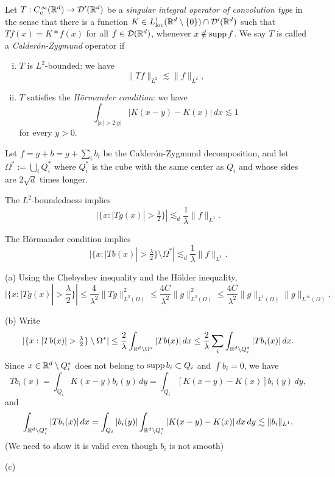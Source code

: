 \documentclass{../../large}
\begin{document}
\begin{prb}
Let $T:C_c^\infty(\mathbb{R}^d)\to\mathcal{D}'(\mathbb{R}^d)$ be a \emph{singular integral operator of convolution type} in the sense that there is a function $K\in L_{\mathrm{loc}}^1(\mathbb{R}^d\setminus\{0\})\cap\mathcal{D}'(\mathbb{R}^d)$ such that $Tf(x)=K*f(x)$ for all $f\in\mathcal{D}(\mathbb{R}^d)$, whenever $x\notin\operatorname{supp} f$.
We say $T$ is called a \emph{Calder\'on-Zygmund} operator if
\begin{enumerate}[(i)]
\item $T$ is $L^2$-bounded: we have
\[\|Tf\|_{L^2}\lesssim\|f\|_{L^2},\]
\item $T$ satisfies the \emph{H\"ormander condition}: we have
\[\int_{|x|>2|y|}|K(x-y)-K(x)|\,dx\lesssim1\]
for every $y>0$.
\end{enumerate}

Let $f=g+b=g+\sum_ib_i$ be the Calder\'on-Zygmund decomposition, and let $\Omega^*:=\bigcup_iQ_i^*$ where $Q_i^*$ is the cube with the same center as $Q_i$ and whose sides are $2\sqrt d$ times longer. 
\begin{parts}
\item
The $L^2$-boundedness implies
\[|\{x:|Tg(x)|>\tfrac\lambda2\}|\lesssim_d\frac1\lambda\|f\|_{L^1}.\]
\item
The H\"ormander condition implies
\[|\{x:|Tb(x)|>\tfrac\lambda2\}\setminus\Omega^*|\lesssim_d\frac1\lambda\|f\|_{L^1}.\]
\item
\end{parts}
\end{prb}
\begin{pf}
(a)
Using the Chebyshev inequality and the H\"older inequality,
\[|\{x:|Tg(x)|>\frac\lambda2\}|
\le\frac4{\lambda^2}\|Tg\|_{L^2(\Omega)}^2
\le\frac{4C}{\lambda^2}\|g\|_{L^2(\Omega)}^2
\le\frac{4C}{\lambda^2}\|g\|_{L^1(\Omega)}\|g\|_{L^\infty(\Omega)}.
\]

(b)
Write
\[|\{x:|Tb(x)|>\tfrac\lambda2\}\setminus\Omega^*|
\le\frac2\lambda\int_{\R^d\setminus\Omega^*}|Tb(x)|\,dx
\le\frac2\lambda\sum_i\int_{\R^d\setminus Q_i^*}|Tb_i(x)|\,dx.\]
Since $x\in\mathbb{R}^d\setminus Q_i^*$ does not belong to $\operatorname{supp} b_i\subset Q_i$ and $\int b_i=0$, we have
\[Tb_i(x)=\int_{Q_i}K(x-y)b_i(y)\,dy=\int_{Q_i}[K(x-y)-K(x)]b_i(y)\,dy,\]
and
\[\int_{\mathbb{R}^d\setminus Q_i^*}|Tb_i(x)|\,dx
=\int_{Q_i}|b_i(y)|\int_{\mathbb{R}^d\setminus Q_i^*}|K(x-y)-K(x)|\,dx\,dy
\lesssim\|b_i\|_{L^1}.\]
(We need to show it is valid even though $b_i$ is not smooth)

(c)

\end{pf}
\end{document}
